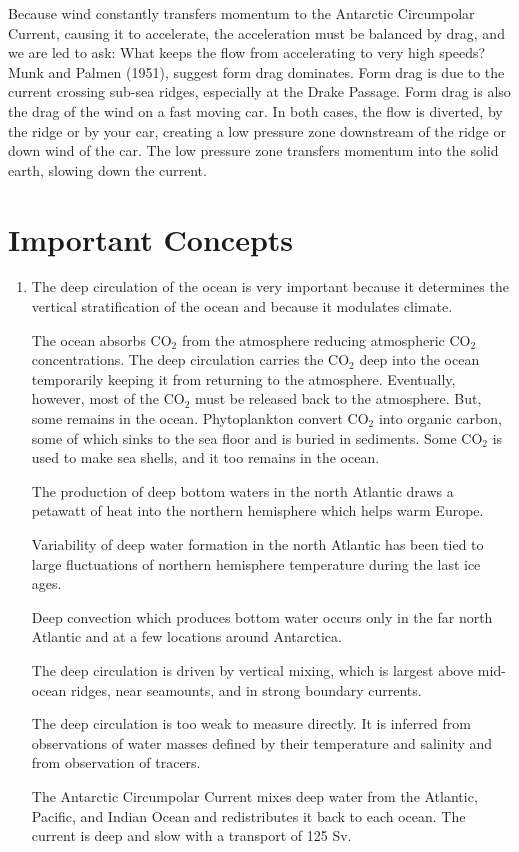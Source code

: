 Because wind constantly transfers momentum to the Antarctic
Circumpolar Current, causing it
to accelerate, the acceleration must be balanced by drag, and we are
led to ask: What keeps the flow from accelerating to very high speeds?
Munk and Palmen (1951), suggest form drag dominates. Form
drag is due to the current crossing
sub-sea ridges, especially at the Drake Passage. Form drag is also the
drag of the wind on a fast moving car. In both cases, the flow is
diverted, by the ridge or by your car, creating a low pressure zone
downstream of the ridge or down wind of the car. The low pressure zone
transfers momentum into the solid earth, slowing down the current.

\section{Important Concepts}
\begin{enumerate}
\item The deep circulation of the ocean is very important because it
determines the vertical stratification of the ocean and because it
modulates climate.

\vitem The ocean absorbs CO$_2$ from the atmosphere reducing
atmospheric CO$_2$ concentrations.  The deep circulation carries the
CO$_2$ deep into the ocean temporarily keeping it from returning to
the atmosphere. Eventually, however, most of the CO$_2$ must be
released back to the atmosphere. But, some remains in the
ocean. Phytoplankton convert CO$_2$ into organic carbon, some of which
sinks to the sea floor and is buried in sediments. Some CO$_2$ is used
to make sea shells, and it too remains in the ocean.

\vitem The production of deep bottom waters in the north
Atlantic draws
a petawatt of heat into the
northern hemisphere which helps warm Europe.

\vitem Variability of deep water formation in the north Atlantic has
been tied to large fluctuations of northern hemisphere temperature
during the last ice ages.

\vitem Deep convection which produces bottom water occurs only in the
far north Atlantic and at a few locations around Antarctica.

\vitem The deep circulation is driven by vertical
mixing, which is largest above mid-ocean
ridges, near seamounts, and in strong boundary currents.

\vitem The deep circulation is too weak to measure directly. It is
inferred from observations of water masses defined by their
temperature and salinity and from observation of tracers.

\vitem The Antarctic Circumpolar Current mixes deep water from the Atlantic, Pacific, and Indian
Ocean and redistributes it back to each ocean. The current is deep and
slow with a transport of 125 Sv.
\end{enumerate}


